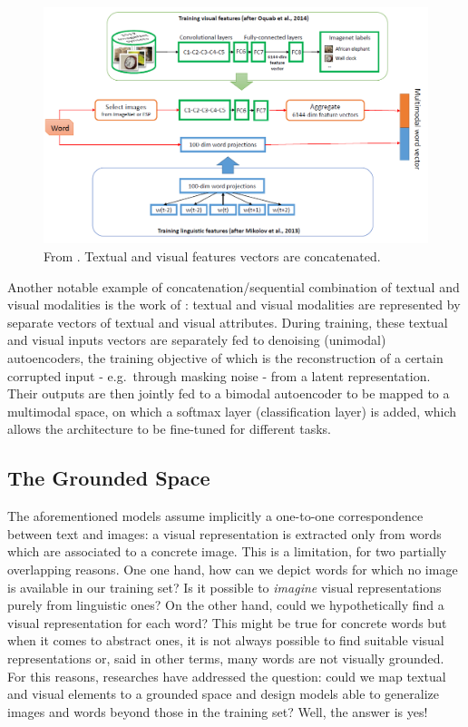 \documentclass[
]{krantz}
\begin{document}
\begin{figure}

{\centering \includegraphics[width=1\linewidth]{figures/02-03-img-support-text/img-kiela2014-01} 

}

\caption{From \citet{kiela2014learning}. Textual and visual features vectors are concatenated.}\label{fig:img-kiela2014-01}
\end{figure}



Another notable example of concatenation/sequential combination of textual and visual modalities is the work of \citet{silberer2014learning}: textual and visual modalities are represented by separate vectors of textual and visual attributes. During training, these textual and visual inputs vectors are separately fed to denoising (unimodal) autoencoders, the training objective of which is the reconstruction of a certain corrupted input - e.g.~through masking noise - from a latent representation. Their outputs are then jointly fed to a bimodal autoencoder to be mapped to a multimodal space, on which a softmax layer (classification layer) is added, which allows the architecture to be fine-tuned for different tasks.

\hypertarget{the-grounded-space}{%
\subsection{The Grounded Space}\label{the-grounded-space}}

The aforementioned models assume implicitly a one-to-one correspondence between text and images: a visual representation is extracted only from words which are associated to a concrete image. This is a limitation, for two partially overlapping reasons. One one hand, how can we depict words for which no image is available in our training set? Is it possible to \emph{imagine} visual representations purely from linguistic ones? On the other hand, could we hypothetically find a visual representation for each word? This might be true for concrete words but when it comes to abstract ones, it is not always possible to find suitable visual representations or, said in other terms, many words are not visually grounded. For this reasons, researches have addressed the question: could we map textual and visual elements to a grounded space and design models able to generalize images and words beyond those in the training set? Well, the answer is yes!
\end{document}

